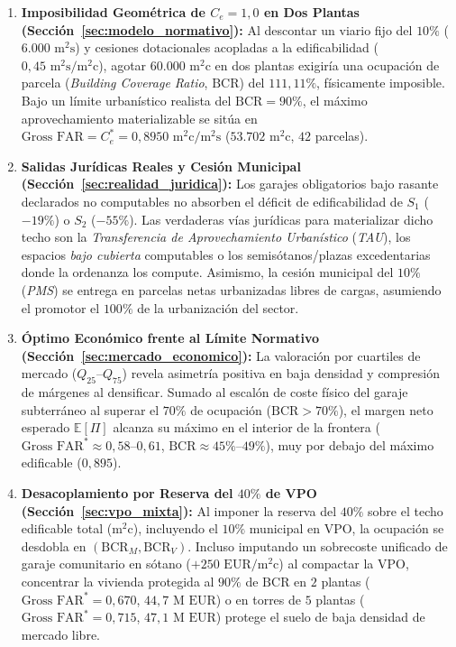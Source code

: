 \begin{enumerate}
  \item \textbf{Imposibilidad Geométrica de $C_e = 1,0$ en Dos Plantas (Sección~\ref{sec:modelo_normativo}):} Al descontar un viario fijo del $10\%$ ($6.000\text{ m}^2\text{s}$) y cesiones dotacionales acopladas a la edificabilidad ($0,45\text{ m}^2\text{s}/\text{m}^2\text{c}$), agotar $60.000\text{ m}^2\text{c}$ en dos plantas exigiría una ocupación de parcela (\emph{Building Coverage Ratio}, $\text{BCR}$) del $111,11\%$, físicamente imposible. Bajo un límite urbanístico realista del $\text{BCR} = 90\%$, el máximo aprovechamiento materializable se sitúa en $\text{Gross FAR} = C_e^* = 0,8950\text{ m}^2\text{c}/\text{m}^2\text{s}$ ($53.702\text{ m}^2\text{c}$, $42$ parcelas).
  \item \textbf{Salidas Jurídicas Reales y Cesión Municipal (Sección~\ref{sec:realidad_juridica}):} Los garajes obligatorios bajo rasante declarados no computables no absorben el déficit de edificabilidad de $S_1$ ($-19\%$) o $S_2$ ($-55\%$). Las verdaderas vías jurídicas para materializar dicho techo son la \emph{Transferencia de Aprovechamiento Urbanístico} (\emph{TAU}), los espacios \emph{bajo cubierta} computables o los semisótanos/plazas excedentarias donde la ordenanza los compute. Asimismo, la cesión municipal del $10\%$ (\emph{PMS}) se entrega en parcelas netas urbanizadas libres de cargas, asumiendo el promotor el $100\%$ de la urbanización del sector.
  \item \textbf{Óptimo Económico frente al Límite Normativo (Sección~\ref{sec:mercado_economico}):} La valoración por cuartiles de mercado ($Q_{25}$--$Q_{75}$) revela asimetría positiva en baja densidad y compresión de márgenes al densificar. Sumado al escalón de coste físico del garaje subterráneo al superar el $70\%$ de ocupación ($\text{BCR} > 70\%$), el margen neto esperado $\mathbb{E}[\Pi]$ alcanza su máximo en el interior de la frontera ($\text{Gross FAR}^* \approx 0,58$--$0,61$, $\text{BCR} \approx 45\%$--$49\%$), muy por debajo del máximo edificable ($0,895$).
  \item \textbf{Desacoplamiento por Reserva del $40\%$ de VPO (Sección~\ref{sec:vpo_mixta}):} Al imponer la reserva del $40\%$ sobre el techo edificable total ($\text{m}^2\text{c}$), incluyendo el $10\%$ municipal en VPO, la ocupación se desdobla en $(\text{BCR}_M, \text{BCR}_V)$. Incluso imputando un sobrecoste unificado de garaje comunitario en sótano ($+250\text{ EUR}/\text{m}^2\text{c}$) al compactar la VPO, concentrar la vivienda protegida al $90\%$ de $\text{BCR}$ en $2$ plantas ($\text{Gross FAR}^* = 0,670$, $44,7\text{ M EUR}$) o en torres de $5$ plantas ($\text{Gross FAR}^* = 0,715$, $47,1\text{ M EUR}$) protege el suelo de baja densidad de mercado libre.

\end{enumerate}
